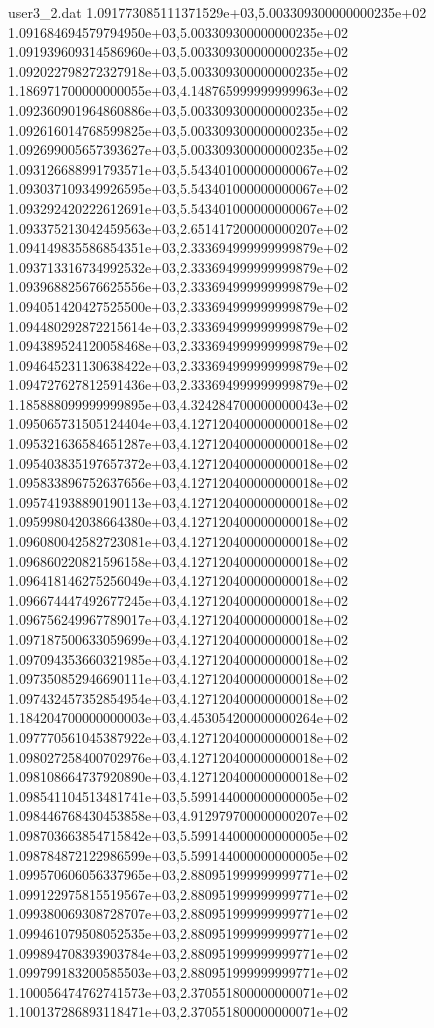 \begin{filecontents}{user3_2.dat}
1.091773085111371529e+03,5.003309300000000235e+02
1.091684694579794950e+03,5.003309300000000235e+02
1.091939609314586960e+03,5.003309300000000235e+02
1.092022798272327918e+03,5.003309300000000235e+02
1.186971700000000055e+03,4.148765999999999963e+02
1.092360901964860886e+03,5.003309300000000235e+02
1.092616014768599825e+03,5.003309300000000235e+02
1.092699005657393627e+03,5.003309300000000235e+02
1.093126688991793571e+03,5.543401000000000067e+02
1.093037109349926595e+03,5.543401000000000067e+02
1.093292420222612691e+03,5.543401000000000067e+02
1.093375213042459563e+03,2.651417200000000207e+02
1.094149835586854351e+03,2.333694999999999879e+02
1.093713316734992532e+03,2.333694999999999879e+02
1.093968825676625556e+03,2.333694999999999879e+02
1.094051420427525500e+03,2.333694999999999879e+02
1.094480292872215614e+03,2.333694999999999879e+02
1.094389524120058468e+03,2.333694999999999879e+02
1.094645231130638422e+03,2.333694999999999879e+02
1.094727627812591436e+03,2.333694999999999879e+02
1.185888099999999895e+03,4.324284700000000043e+02
1.095065731505124404e+03,4.127120400000000018e+02
1.095321636584651287e+03,4.127120400000000018e+02
1.095403835197657372e+03,4.127120400000000018e+02
1.095833896752637656e+03,4.127120400000000018e+02
1.095741938890190113e+03,4.127120400000000018e+02
1.095998042038664380e+03,4.127120400000000018e+02
1.096080042582723081e+03,4.127120400000000018e+02
1.096860220821596158e+03,4.127120400000000018e+02
1.096418146275256049e+03,4.127120400000000018e+02
1.096674447492677245e+03,4.127120400000000018e+02
1.096756249967789017e+03,4.127120400000000018e+02
1.097187500633059699e+03,4.127120400000000018e+02
1.097094353660321985e+03,4.127120400000000018e+02
1.097350852946690111e+03,4.127120400000000018e+02
1.097432457352854954e+03,4.127120400000000018e+02
1.184204700000000003e+03,4.453054200000000264e+02
1.097770561045387922e+03,4.127120400000000018e+02
1.098027258400702976e+03,4.127120400000000018e+02
1.098108664737920890e+03,4.127120400000000018e+02
1.098541104513481741e+03,5.599144000000000005e+02
1.098446768430453858e+03,4.912979700000000207e+02
1.098703663854715842e+03,5.599144000000000005e+02
1.098784872122986599e+03,5.599144000000000005e+02
1.099570606056337965e+03,2.880951999999999771e+02
1.099122975815519567e+03,2.880951999999999771e+02
1.099380069308728707e+03,2.880951999999999771e+02
1.099461079508052535e+03,2.880951999999999771e+02
1.099894708393903784e+03,2.880951999999999771e+02
1.099799183200585503e+03,2.880951999999999771e+02
1.100056474762741573e+03,2.370551800000000071e+02
1.100137286893118471e+03,2.370551800000000071e+02

\end{filecontents}
